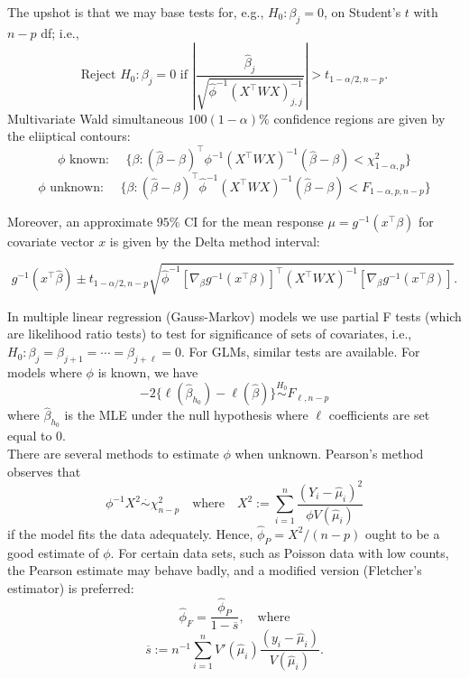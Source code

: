 \documentclass[
]{book}
\begin{document}
The upshot is that we may base tests for, e.g., \(H_0:\beta_j = 0\), on Student's \(t\) with \(n-p\) df; i.e.,
\[\text{Reject }H_0:\beta_j = 0 \text{ if }\left|\frac{\hat\beta_j}{\sqrt{\hat\phi^{-1}(X^\top W X)^{-1}_{j,j}}}\right| > t_{1-\alpha/2,n-p}.\]
Multivariate Wald simultaneous \(100(1-\alpha)\%\) confidence regions are given by the eliiptical contours:
\[\phi\text{ known: }\quad \{\beta: (\hat\beta - \beta)^\top\phi^{-1}(X^\top W X)^{-1}(\hat\beta - \beta)< \chi^2_{1-\alpha,p} \}\]
\[\phi\text{ unknown: }\quad \{\beta: (\hat\beta - \beta)^\top\hat\phi^{-1}(X^\top W X)^{-1}(\hat\beta - \beta)< F_{1-\alpha,p, n-p} \}\]

Moreover, an approximate \(95\%\) CI for the mean response \(\mu = g^{-1}(x^\top \beta)\) for covariate vector \(x\) is given by the Delta method interval:

\[g^{-1}(x^\top \hat\beta)\pm t_{1-\alpha/2,n-p}\sqrt{\hat\phi^{-1} \left[\nabla_{\beta} g^{-1}(x^\top \beta)\right]^\top(X^\top W X)^{-1}\left[\nabla_{\beta} g^{-1}(x^\top \beta)\right]}.\]

In multiple linear regression (Gauss-Markov) models we use partial F tests (which are likelihood ratio tests) to test for significance of sets of covariates, i.e., \(H_0: \beta_j = \beta_{j+1} = \cdots = \beta_{j+\ell} = 0\). For GLMs, similar tests are available. For models where \(\phi\) is known, we have
\[-2\{\ell(\hat\beta_{h_0}) - \ell(\hat\beta)\}\stackrel{H_0}{\sim} F_{\ell,n-p}\]
where \(\hat\beta_{h_0}\) is the MLE under the null hypothesis where \(\ell\) coefficients are set equal to 0.\\

There are several methods to estimate \(\phi\) when unknown. Pearson's method observes that
\[\phi^{-1}X^2 \stackrel{\cdot}{\sim}\chi^2_{n-p}\quad \text{where}\quad X^2 :=\sum_{i=1}^n \frac{(Y_i - \hat\mu_i)^2}{\phi V(\hat\mu_i)}\]
if the model fits the data adequately. Hence, \(\hat\phi_P = X^2/(n-p)\) ought to be a good estimate of \(\phi\). For certain data sets, such as Poisson data with low counts, the Pearson estimate may behave badly, and a modified version (Fletcher's estimator) is preferred:
\[\hat\phi_F = \frac{\hat\phi_P}{1-\overline s}, \quad\text{where}\]
\[\overline s:=n^{-1}\sum_{i=1}^n V'(\hat\mu_i)\frac{(y_i - \hat\mu_i)}{V(\hat\mu_i)}.\]
\end{document}
